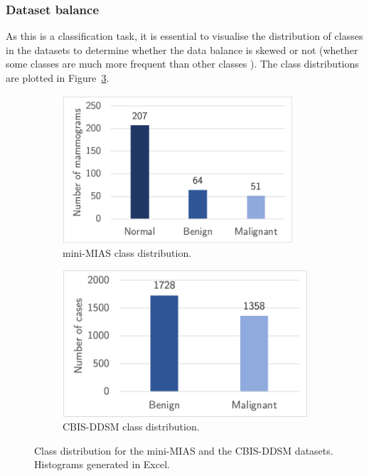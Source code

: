 \subsubsection{Dataset balance}

As this is a classification task, it is essential to visualise the distribution of classes in the datasets to determine whether the data balance is skewed or not (whether some classes are much more frequent than other classes \citep{Geron2019}). The class distributions are plotted in Figure~\ref{fig:design-datasets-balance}.

\begin{figure}[h]
\centering
\begin{subfigure}{.5\textwidth}
  \centering
  \includegraphics[width=0.94\textwidth]{figures/design/mini-mias-balance.png}
  \caption{mini-MIAS class distribution.}
  \label{fig:design-mini-mias-balance}
\end{subfigure}%
\begin{subfigure}{.5\textwidth}
  \centering
  \includegraphics[width=\textwidth]{figures/design/cbis-ddsm-balance.png}
  \caption{CBIS-DDSM class distribution.}
  \label{fig:cbis-ddsm-balance}
\end{subfigure}
\caption{\label{fig:design-datasets-balance}Class distribution for the mini-MIAS and the CBIS-DDSM datasets. Histograms generated in Excel.}
\end{figure}


